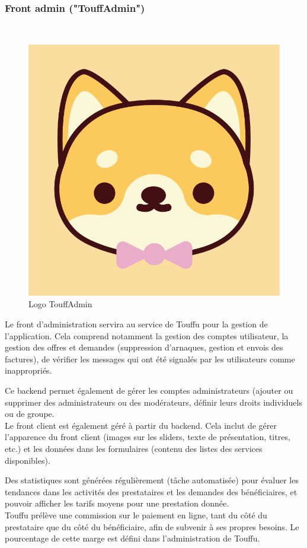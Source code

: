 \documentclass[conference]{IEEEtran}
\begin{document}
\subsubsection{Front admin ("TouffAdmin")}\hfill\\

\begin{figure}[h]
	\centering
	\includegraphics[width=0.4\columnwidth]{Ressources/Icons/v1_3@3x.png}
	\caption{Logo TouffAdmin}
	\label{fig:logotouffadmin}
\end{figure}

Le front d'administration servira au service de Touffu pour la gestion de l'application. Cela comprend notamment la gestion des comptes utilisateur, la gestion des offres et demandes (suppression d'arnaques, gestion et envois des factures), de vérifier les messages qui ont été signalés par les utilisateurs comme inappropriés.

Ce backend permet également de gérer les comptes administrateurs (ajouter ou supprimer des administrateurs ou des modérateurs, définir leurs droits individuels ou de groupe.\\

Le front client est également géré à partir du backend. Cela inclut de gérer l'apparence du front client (images sur les sliders, texte de présentation, titres, etc.) et les données dans les formulaires (contenu des listes des services disponibles).

Des statistiques sont générées régulièrement (tâche automatisée) pour évaluer les tendances dans les activités des prestataires et les demandes des bénéficiaires, et pouvoir afficher les tarifs moyens pour une prestation donnée.\\

Touffu prélève une commission sur le paiement en ligne, tant du côté du prestataire que du côté du bénéficiaire, afin de subvenir à ses propres besoins. Le pourcentage de cette marge est défini dans l'administration de Touffu.\\
\end{document}
